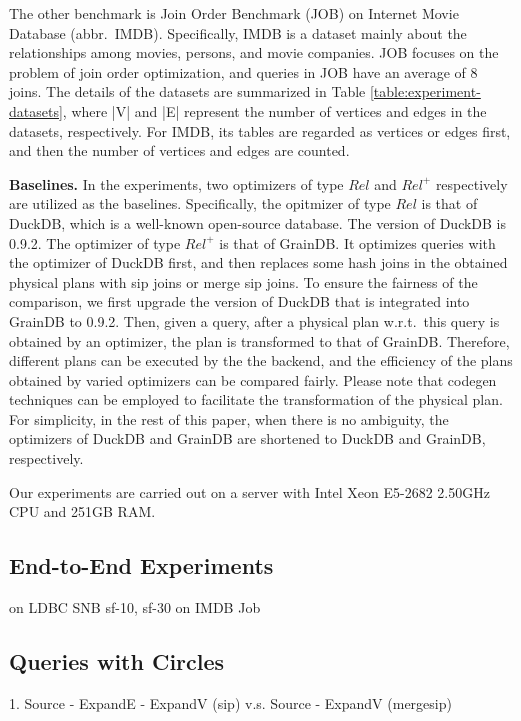 The other benchmark is Join Order Benchmark (JOB) on Internet Movie Database (abbr.~IMDB).
Specifically, IMDB is a dataset mainly about the relationships among movies, persons, and movie companies.
JOB focuses on the problem of join order optimization, and queries in JOB have an average of 8 joins.
The details of the datasets are summarized in Table \ref{table:experiment-datasets}, where |V| and |E| represent the number of vertices and edges in the datasets, respectively.
For IMDB, its tables are regarded as vertices or edges first, and then the number of vertices and edges are counted.

\textbf{Baselines. }
In the experiments, two optimizers of type $Rel$ and $Rel^+$ respectively are utilized as the baselines.
Specifically, the opitmizer of type $Rel$ is that of DuckDB, which is a well-known open-source database.
The version of DuckDB is 0.9.2.
The optimizer of type $Rel^+$ is that of GrainDB.
It optimizes queries with the optimizer of DuckDB first, and then replaces some hash joins in the obtained physical plans with sip joins or merge sip joins.
To ensure the fairness of the comparison, we first upgrade the version of DuckDB that is integrated into GrainDB to 0.9.2.
Then, given a query, after a physical plan w.r.t.~this query is obtained by an optimizer, the plan is transformed to that of GrainDB.
Therefore, different plans can be executed by the the backend, and the efficiency of the plans obtained by varied optimizers can be compared fairly.
Please note that codegen techniques can be employed to facilitate the transformation of the physical plan.
For simplicity, in the rest of this paper, when there is no ambiguity, the optimizers of DuckDB and GrainDB are shortened to DuckDB and GrainDB, respectively.

Our experiments are carried out on a server with Intel Xeon E5-2682 2.50GHz CPU and 251GB RAM.

\subsection{End-to-End Experiments}
\label{sec:experiment-e2e}

on LDBC SNB sf-10, sf-30
on IMDB Job

\subsection{Queries with Circles}
\label{sec:experiment-circle}

1. Source - ExpandE - ExpandV (sip) v.s. Source - ExpandV (mergesip)

